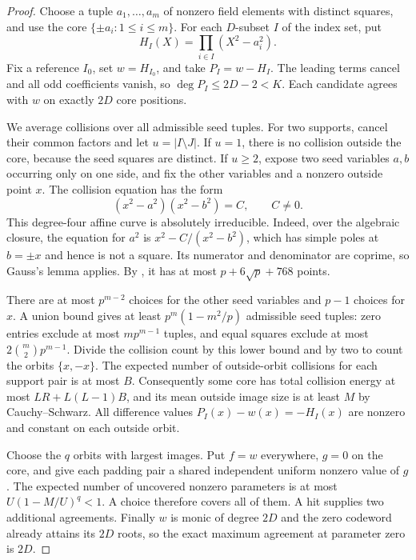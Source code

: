 \begin{proof}
Choose a tuple $a_1,\ldots,a_m$ of nonzero field elements with distinct
squares, and use the core $\{\pm a_i:1\le i\le m\}$. For each
$D$-subset $I$ of the index set, put
\[
 H_I(X)=\prod_{i\in I}(X^2-a_i^2).
\]
Fix a reference $I_0$, set $w=H_{I_0}$, and take $P_I=w-H_I$.
The leading terms cancel and all odd coefficients vanish, so
$\deg P_I\le2D-2<K$. Each candidate agrees with $w$ on exactly
$2D$ core positions.

We average collisions over all admissible seed tuples. For two supports,
cancel their common factors and let $u=|I\setminus J|$. If $u=1$,
there is no collision outside the core, because the seed squares are
distinct. If $u\ge2$, expose two seed variables $a,b$ occurring only
on one side, and fix the other variables and a nonzero outside point
$x$. The collision equation has the form
\[
 (x^2-a^2)(x^2-b^2)=C,\qquad C\ne0.
\]
This degree-four affine curve is absolutely irreducible. Indeed, over
the algebraic closure, the equation for $a^2$ is
$x^2-C/(x^2-b^2)$, which has simple poles at $b=\pm x$ and hence is
not a square. Its numerator and denominator are coprime, so Gauss's
lemma applies. By \cite[Corollary~5.6]{cafure-matera}, it has at most
$p+6\sqrt p+768$ points.

There are at most $p^{m-2}$ choices for the other seed variables and
$p-1$ choices for $x$. A union bound gives at least
$p^m(1-m^2/p)$ admissible seed tuples: zero entries exclude at most
$mp^{m-1}$ tuples, and equal squares exclude at most
$2\binom m2p^{m-1}$. Divide the collision count by this lower bound
and by two to count the orbits $\{x,-x\}$. The expected number of
outside-orbit collisions for each support pair is at most $B$.
Consequently some core has total collision energy at most
$LR+L(L-1)B$, and its mean outside image size is at least $M$ by
Cauchy--Schwarz. All difference values $P_I(x)-w(x)=-H_I(x)$ are
nonzero and constant on each outside orbit.

Choose the $q$ orbits with largest images. Put $f=w$ everywhere,
$g=0$ on the core, and give each padding pair a shared independent
uniform nonzero value of $g$. The expected number of uncovered nonzero
parameters is at most $U(1-M/U)^q<1$. A choice therefore covers all of
them. A hit supplies two additional agreements. Finally $w$ is monic
of degree $2D$ and the zero codeword already attains its $2D$ roots,
so the exact maximum agreement at parameter zero is $2D$.
\end{proof}

